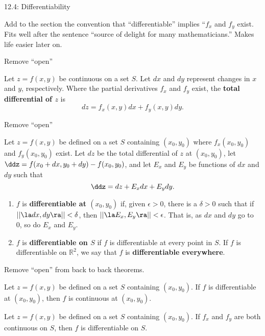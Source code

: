 \documentclass{article}
\begin{document}
12.4: Differentiability

Add to the section the convention that ``differentiable'' implies ``$f_x$ and $f_y$ exist. Fits well after the sentence ``source of delight for many mathematicians.'' Makes life easier later on.

Remove ``open''

{Let $z=f(x,y)$ be continuous on a set $S$. Let $dx$ and $dy$ represent changes in $x$ and $y$, respectively. Where the partial derivatives $f_x$ and $f_y$ exist, the \textbf{total differential of $z$} is 
$$dz = f_x(x,y)dx + f_y(x,y)dy.$$
}

Remove ``open''

{Let $z=f(x,y)$ be defined on a set $S$ containing $(x_0,y_0)$ where $f_x(x_0,y_0)$ and $f_y(x_0,y_0)$ exist. Let $dz$ be the total differential of $z$ at $(x_0,y_0)$, let $\ddz = f(x_0+dx,y_0+dy) - f(x_0,y_0)$, and let $E_x$ and $E_y$ be functions of $dx$ and $dy$  such that 
$$\ddz = dz + E_xdx + E_ydy.$$
\begin{enumerate}
	\item $f$ is \textbf{differentiable at $(x_0,y_0)$} if, given $\epsilon >0$, there is a $\delta >0$ such that if $||\la dx,dy\ra|| < \delta$, then $||\la E_x,E_y\ra|| < \epsilon$. That is, as $dx$ and $dy$ go to 0, so do $E_x$ and $E_y$.
	\item	$f$ is \textbf{differentiable on $S$} if $f$ is differentiable at every point in $S$. If $f$ is differentiable on $\mathbb{R}^2$, we say that $f$ is \textbf{differentiable everywhere}.
\end{enumerate}
}

Remove ``open'' from back to back theorems.

{Let $z=f(x,y)$ be defined on a set $S$ containing $(x_0,y_0)$. 
If $f$ is differentiable at $(x_0,y_0)$, then $f$ is continuous at $(x_0,y_0)$.
}

{Let $z=f(x,y)$ be defined on a set $S$ containing $(x_0,y_0)$. 
If $f_x$ and $f_y$ are both continuous on $S$, then $f$ is differentiable on $S$.
}
\end{document}
